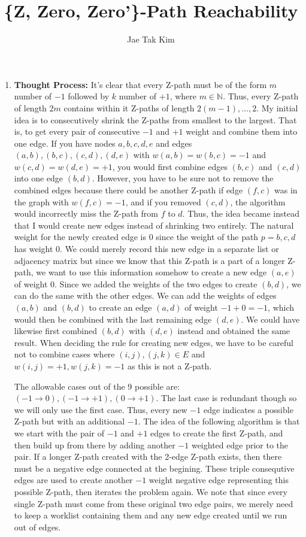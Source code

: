 \documentclass[11pt]{article}
\title{\{Z, Zero, Zero'\}-Path Reachability}
\author{Jae Tak Kim}
\date{}
\theoremstyle{remark}
\theoremstyle{remark}
\begin{document}
\maketitle

\begin{enumerate}
    \item \textbf{Thought Process:} It's clear that every Z-path must be of the form $m$ number of $-1$ followed by $k$ number of $+1$, where $m\in\mathbb{N}$. Thus, every Z-path of length $2m$ contains within it Z-paths of length $2(m-1),\ldots,2$. My initial idea is to consecutively shrink the Z-paths from smallest to the largest. That is, to get every pair of consecutive $-1$ and $+1$ weight and combine them into one edge. If you have nodes $a,b,c,d,e$ and edges $(a,b), (b,c), (c,d), (d,e)$ with $w(a,b)=w(b,c)=-1$ and $w(c,d)=w(d,e)=+1$, you would first combine edges $(b,c)$ and $(c,d)$ into one edge $(b,d)$. However, you have to be sure not to remove the combined edges because there could be another Z-path if edge $(f,c)$ was in the graph with $w(f,c)=-1$, and if you removed $(c,d)$, the algorithm would incorrectly miss the Z-path from $f$ to $d$. Thus, the idea became instead that I would create new edges instead of shrinking two entirely. The natural weight for the newly created edge is 0 since the weight of the path $p=b,c,d$ has weight 0. We could merely record this new edge in a separate list or adjacency matrix but since we know that this Z-path is a part of a longer Z-path, we want to use this information somehow to create a new edge $(a,e)$ of weight 0. Since we added the weights of the two edges to create $(b,d)$, we can do the same with the other edges. We can add the weights of edges $(a,b)$ and $(b,d)$ to create an edge $(a,d)$ of weight $-1+0=-1$, which would then be combined with the last remaining edge $(d,e)$. We could have likewise first combined $(b,d)$ with $(d,e)$ instead and obtained the same result. When deciding the rule for creating new edges, we have to be careful not to combine cases where $(i,j), (j,k) \in E$ and $w(i,j) = +1, w(j,k) = -1$ as this is not a Z-path.

    The allowable cases out of the 9 possible are: $(-1 \rightarrow 0), (-1 \rightarrow +1), (0 \rightarrow +1)$. The last case is redundant though so we will only use the first case. Thus, every new $-1$ edge indicates a possible Z-path but with an additional $-1$. The idea of the following algorithm is that we start with the pair of $-1$ and $+1$ edges to create the first Z-path, and then build up from there by adding another $-1$ weighted edge prior to the pair. If a longer Z-path created with the 2-edge Z-path exists, then there must be a negative edge connected at the begining. These triple consequtive edges are used to create another $-1$ weight negative edge representing this possible Z-path, then iterates the problem again. We note that since every single Z-path must come from these original two edge pairs, we merely need to keep a worklist containing them and any new edge created until we run out of edges.


\end{enumerate}
\end{document}
